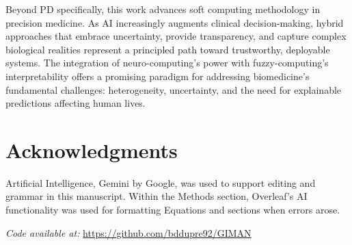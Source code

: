 \documentclass[journal,twoside,web]{ieeecolor}
\begin{document}
Beyond PD specifically, this work advances soft computing methodology in precision medicine. As AI increasingly augments clinical decision-making, hybrid approaches that embrace uncertainty, provide transparency, and capture complex biological realities represent a principled path toward trustworthy, deployable systems. The integration of neuro-computing's power with fuzzy-computing's interpretability offers a promising paradigm for addressing biomedicine's fundamental challenges: heterogeneity, uncertainty, and the need for explainable predictions affecting human lives.

\section{Acknowledgments}

Artificial Intelligence, Gemini by Google, was used to support editing and grammar in this manuscript. Within the Methods section, Overleaf's AI functionality was used for formatting Equations and sections when errors arose.


\textit{Code available at:} \url{https://github.com/bddupre92/GIMAN}
\end{document}
